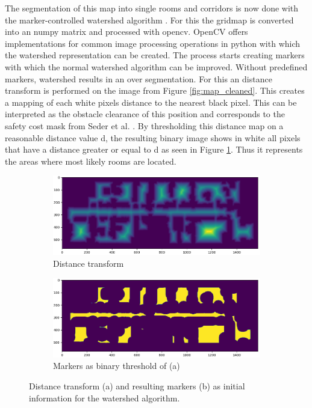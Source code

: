 The segmentation of this map into single rooms and corridors is now done with the marker-controlled watershed algorithm \cite{parvati_image_2009}. For this the gridmap is converted into an numpy matrix and processed with opencv. OpenCV offers implementations for common image processing operations in python with which the watershed representation can be created. The process starts creating markers with which the normal watershed algorithm can be improved. Without predefined markers, watershed results in an over segmentation. For this an distance transform is performed on the image from Figure \ref{fig:map_cleaned}. This creates a mapping of each white pixels distance to the nearest black pixel. This can be interpreted as the obstacle clearance of this position and corresponds to the safety cost mask from Seder et al. \cite{seder_hierarchical_2011}. By thresholding this distance map on a reasonable distance value d, the resulting binary image shows in white all pixels that have a distance greater or equal to d as seen in Figure \ref{fig:distance_transform}. Thus it represents the areas where most likely rooms are located. 

\begin{figure}[h]
    \captionsetup[subfigure]{justification=centering}
    \centering
    \begin{subfigure}{.5\textwidth}
      \centering
      \includegraphics[width=\textwidth]{figures/50_implementation/ryu_distance_transform.png}
      \caption{Distance transform}
    \end{subfigure}%
    \begin{subfigure}{.5\textwidth}
      \centering
      \includegraphics[width=\textwidth]{figures/50_implementation/ryu_markers.png}
      \caption{Markers as binary threshold of (a)}
    \end{subfigure}
    \caption[Distance transform and resulting markers]{Distance transform (a) and resulting markers (b) as initial information for the watershed algorithm.}
    \label{fig:distance_transform}
\end{figure}

